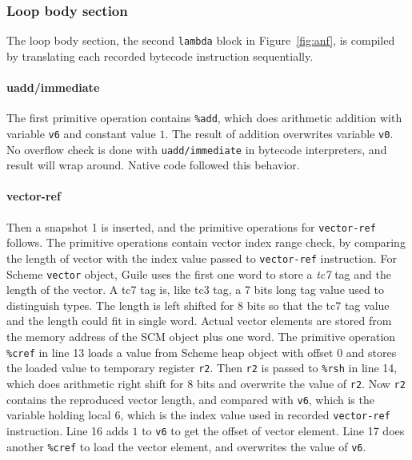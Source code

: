 \documentclass[preprint, 10pt]{sigplanconf}
\begin{document}
\subsubsection{Loop body section}

The loop body section, the second \texttt{lambda} block in
Figure~\hyperref[fig:anf]{\ref{fig:anf}}, is compiled by translating each
recorded bytecode instruction sequentially.

\paragraph{uadd/immediate} The first primitive operation contains
\texttt{\%add}, which does arithmetic addition with variable \texttt{v6} and
constant value $1$. The result of addition overwrites variable \texttt{v0}. No
overflow check is done with \texttt{uadd/immediate} in bytecode interpreters,
and result will wrap around. Native code followed this behavior.

\paragraph{vector-ref} Then a snapshot 1 is inserted, and
the primitive operations for \texttt{vector-ref} follows. The primitive
operations contain vector index range check, by comparing the length of vector
with the index value passed to \texttt{vector-ref} instruction. For Scheme
\texttt{vector} object, Guile uses the first one word to store a \textit{tc7}
tag and the length of the vector. A tc7 tag is, like tc3 tag, a 7 bits long
tag value used to distinguish types. The length is left shifted for 8 bits so
that the tc7 tag value and the length could fit in single word. Actual vector
elements are stored from the memory address of the SCM object plus one word.
The primitive operation \texttt{\%cref} in line 13 loads a value from Scheme
heap object with offset 0 and stores the loaded value to temporary register
\texttt{r2}. Then \texttt{r2} is passed to \texttt{\%rsh} in line 14, which
does arithmetic right shift for 8 bits and overwrite the value of
\texttt{r2}. Now \texttt{r2} contains the reproduced vector length, and
compared with \texttt{v6}, which is the variable holding local 6, which is the
index value used in recorded \texttt{vector-ref} instruction. Line 16 adds $1$
to \texttt{v6} to get the offset of vector element. Line 17 does another
\texttt{\%cref} to load the vector element, and overwrites the value of
\texttt{v6}.
\end{document}
